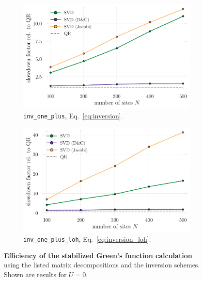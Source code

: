 \documentclass[submission, Phys]{SciPost}
\begin{document}
\begin{figure}
	\centering
	\begin{subfigure}{0.48\textwidth}
			\includegraphics[width=\textwidth]{figures/benchmark_fact_inv_one_plus.pdf}
		\caption{\texttt{inv\_one\_plus}, Eq.~\eqref{eq:inversion}. \label{fig:greens_benchmark_regularinv}}
	\end{subfigure}%
	\hspace{10pt}
	\begin{subfigure}{0.48\textwidth}
		\includegraphics[width=\textwidth]{figures/benchmark_fact_inv_one_plus_loh.pdf}
		\caption{\texttt{inv\_one\_plus\_loh}, Eq.~\eqref{eq:inversion_loh}. \label{fig:greens_benchmark_loh}}
	\end{subfigure}
	\vspace{5pt}
	\caption{\textbf{Efficiency of the stabilized Green's function calculation} using the listed matrix decompositions and the inversion schemes. Shown are results for $U=0$.}
\end{figure}
\end{document}
